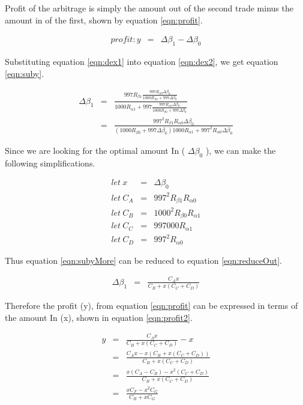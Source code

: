 \documentclass{article}
\begin{document}
	Profit of the arbitrage is simply the amount out of the second trade minus the amount in of the first, shown by equation \ref{eqn:profit}.
	
	\begin{eqnarray}
		profit: y  &=& \Delta\beta_{1} - \Delta\beta_{0} \label{eqn:profit}
	\end{eqnarray}
	
	
	Substituting equation \ref{eqn:dex1} into equation \ref{eqn:dex2}, we get equation \ref{eqn:suby}.
	
	\begin{eqnarray}
		\Delta\beta_{1}  &=& \frac{997 R_{\beta 1} \frac{997 R_{\alpha 0} \Delta\beta_{0} }{1000 R_{\beta 0} + 997 \Delta\beta_{0}} }{1000 R_{\alpha 1} + 997 \frac{997 R_{\alpha 0} \Delta\beta_{0} }{1000 R_{\beta 0} + 997 \Delta\beta_{0}}} \label{eqn:suby}\\
		&=& \frac{997^2 R_{\beta 1}  R_{\alpha 0} \Delta\beta_{0} }{(1000 R_{\beta 0} + 997 \Delta\beta_{0}) 1000 R_{\alpha 1} + 997^2 R_{\alpha 0} \Delta\beta_{0} } \label{eqn:subyMore}
	\end{eqnarray}
	
	Since we are looking for the optimal amount In ( \(\Delta\beta_{0}\) ), we can make the following simplifications.
	
	\begin{eqnarray}
		let \: x &=& \Delta\beta_{0}\\
		let \: C_{A} &=& 997^2 R_{\beta 1}  R_{\alpha 0}\\
		let \: C_{B} &=& 1000^2 R_{\beta 0} R_{\alpha 1}\\
		let \: C_{C} &=& 997000  R_{\alpha 1}\\
		let \: C_{D} &=& 997^2  R_{\alpha 0}
	\end{eqnarray}
	
	Thus equation \ref{eqn:subyMore} can be reduced to equation \ref{eqn:reduceOut}.
	
	\begin{eqnarray}
		\Delta\beta_{1}  &=& \frac{C_{A} x}{C_{B} + x(C_{C} + C_{D})} \label{eqn:reduceOut}
	\end{eqnarray}
	
	Therefore the profit (y), from equation \ref{eqn:profit} can be expressed in terms of the amount In (x), shown in equation \ref{eqn:profit2}.
	
	\begin{eqnarray}
		y  &=& \frac{C_{A} x}{C_{B} + x(C_{C} + C_{D})} - x \label{eqn:profit2}\\
		&=& \frac{C_{A} x - x(C_{B} + x(C_{C} + C_{D}))}{C_{B} + x(C_{C} + C_{D})} \label{eqn:profit3}\\
		&=& \frac{x(C_{A} - C_{B}) - x^2(C_{C} + C_{D})}{C_{B} + x(C_{C} + C_{D})} \label{eqn:profit4}\\
		&=& \frac{x C_{F} - x^2 C_{G} }{C_{B} + x C_{G}} \label{eqn:profit5}
	\end{eqnarray}
	
\end{document}
